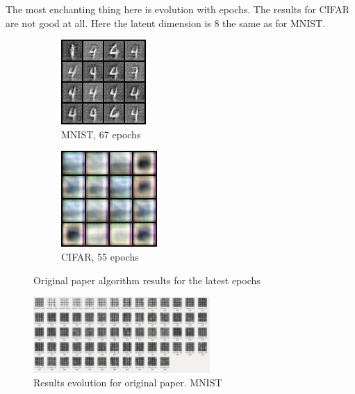 \documentclass{article}
\begin{document}
    The most enchanting thing here is evolution with epochs.
    The results for CIFAR are not good at all. Here the latent dimension is 8 the same as for MNIST.
    \begin{center}
        \begin{figure}[H]{\textwidth}
            \begin{subfigure}{0.5\textwidth}
                \centering
                \includegraphics[width=0.35\linewidth]{figures/samples_67.jpg}
                \caption{MNIST, 67 epochs}
            \end{subfigure}
            \begin{subfigure}{0.5\textwidth}
                \centering
                \includegraphics[width=0.35\linewidth]{figures/samples_55.jpg}
                \caption{CIFAR, 55 epochs}
            \end{subfigure}%
            \caption{Original paper algorithm results for the latest epochs}
        \end{figure}
    \end{center}
    \begin{center}
        \begin{figure}[H]
            \centering
            \includegraphics[width=0.6\textwidth]{figures/MNIST-original-evolution.png}
            \caption{Results evolution for original paper. MNIST}
        \end{figure}
    \end{center}
\end{document}
